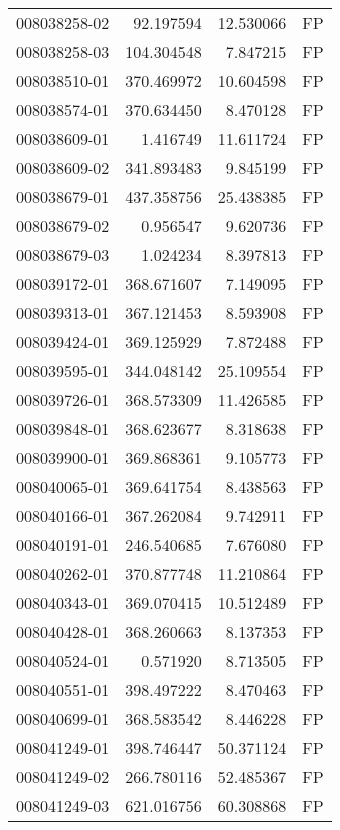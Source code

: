 \begin{tabular}{lrrl}
008038258-02 &   92.197594 &      12.530066 &   FP \\
008038258-03 &  104.304548 &       7.847215 &   FP \\
008038510-01 &  370.469972 &      10.604598 &   FP \\
008038574-01 &  370.634450 &       8.470128 &   FP \\
008038609-01 &    1.416749 &      11.611724 &   FP \\
008038609-02 &  341.893483 &       9.845199 &   FP \\
008038679-01 &  437.358756 &      25.438385 &   FP \\
008038679-02 &    0.956547 &       9.620736 &   FP \\
008038679-03 &    1.024234 &       8.397813 &   FP \\
008039172-01 &  368.671607 &       7.149095 &   FP \\
008039313-01 &  367.121453 &       8.593908 &   FP \\
008039424-01 &  369.125929 &       7.872488 &   FP \\
008039595-01 &  344.048142 &      25.109554 &   FP \\
008039726-01 &  368.573309 &      11.426585 &   FP \\
008039848-01 &  368.623677 &       8.318638 &   FP \\
008039900-01 &  369.868361 &       9.105773 &   FP \\
008040065-01 &  369.641754 &       8.438563 &   FP \\
008040166-01 &  367.262084 &       9.742911 &   FP \\
008040191-01 &  246.540685 &       7.676080 &   FP \\
008040262-01 &  370.877748 &      11.210864 &   FP \\
008040343-01 &  369.070415 &      10.512489 &   FP \\
008040428-01 &  368.260663 &       8.137353 &   FP \\
008040524-01 &    0.571920 &       8.713505 &   FP \\
008040551-01 &  398.497222 &       8.470463 &   FP \\
008040699-01 &  368.583542 &       8.446228 &   FP \\
008041249-01 &  398.746447 &      50.371124 &   FP \\
008041249-02 &  266.780116 &      52.485367 &   FP \\
008041249-03 &  621.016756 &      60.308868 &   FP \\

\end{tabular}
